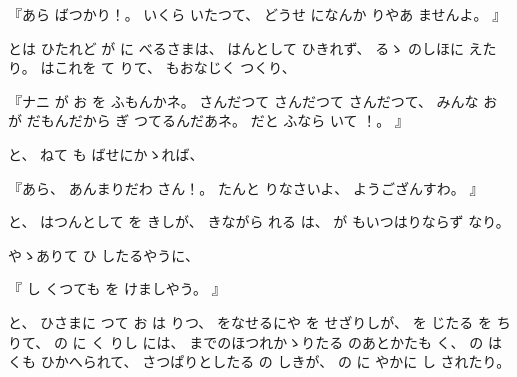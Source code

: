 
『あら
ばつかり！。
%
いくら
いたつて、
%
どうせ
になんか
りやあ
ませんよ。
』

とは
ひたれど
が
に
べるさまは、
%
はんとして
ひきれず、
%
るゝ
のしほに
えたり。
%
はこれを
て
りて、
%
もおなじく
つくり、

『ナニ
が
お
を
ふもんかネ。
%
さんだつて
さんだつて
さんだつて、
%
みんな
お
が
だもんだから
ぎ
つてるんだあネ。
%
だと
ふなら
いて
！。
』

と、
%
ねて
も
ばせにかゝれば、

『あら、
%
あんまりだわ
さん！。
%
たんと
りなさいよ、
%
ようござんすわ。
』

と、
%
はつんとして
を
きしが、
%
きながら
れる
は、
%
が
もいつはりならず
なり。%

やゝありて
ひ
したるやうに、

『
し
くつても
を
けましやう。
』

と、
%
ひさまに
つて
お
は
りつ、
%
をなせるにや
を
せざりしが、
%
を
じたる
を
ち
りて、
%
の
に
く
りし
には、
%
までのほつれかゝりたる
のあとかたも
く、
%
の
は
くも
ひかへられて、
%
さつぱりとしたる
の
しきが、
%
の
に
やかに
し
されたり。

